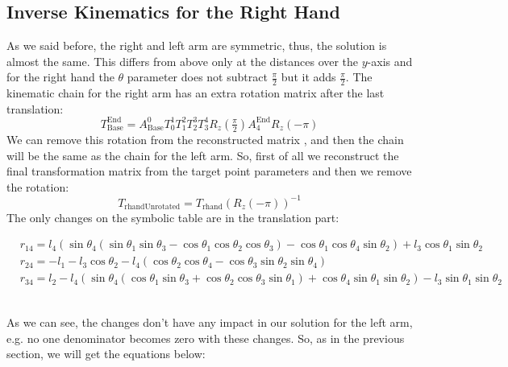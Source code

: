 \subsection{Inverse Kinematics for the Right Hand}
As we said before, the right and left arm are symmetric, thus, the solution is almost the same. This differs from above only at the distances over the \(y\)-axis and for the right hand the \(\theta\) parameter does not subtract $\frac{\pi}{2}$ but it adds $\frac{\pi}{2}$. The kinematic chain for the right arm has an extra rotation matrix after the last translation:
\[
T^\text{End}_\text{Base} = A^0_\text{Base}T^1_0T^2_1T^3_2T^4_3R_z(\tfrac{\pi}{2})A^\text{End}_{4}R_z(-\pi)
\]
We can remove this rotation from the reconstructed matrix , and then the chain will be the same as the chain for the left arm. So, first of all we reconstruct the final transformation matrix from the target point parameters and then we remove the rotation:
\[
T_\text{rhandUnrotated} = T_\text{rhand}{\left(R_z(-\pi)\right)}^{-1}
\]
The only changes on the symbolic table are in the translation part:

\begin{small}
\begin{align*}
&r_{14} = l_4\left(\sin\theta_4\left(\sin\theta_1\sin\theta_3 - \cos\theta_1\cos\theta_2\cos\theta_3\right) - \cos\theta_1\cos\theta_4\sin\theta_2\right) + l_3\cos\theta_1\sin\theta_2\\
&r_{24} = -l_1 - l_3\cos\theta_2 - l_4\left(\cos\theta_2\cos\theta_4 - \cos\theta_3\sin\theta_2\sin\theta_4\right)\\
&r_{34} = l_2 - l_4\left(\sin\theta_4\left(\cos\theta_1\sin\theta_3 + \cos\theta_2\cos\theta_3\sin\theta_1\right) + \cos\theta_4\sin\theta_1\sin\theta_2\right) - l_3\sin\theta_1\sin\theta_2
\end{align*}
\end{small}\\
As we can see, the changes don't have any impact in our solution for the left arm, e.g. no one denominator becomes zero with these changes. So, as in the previous section, we will get the equations below:

